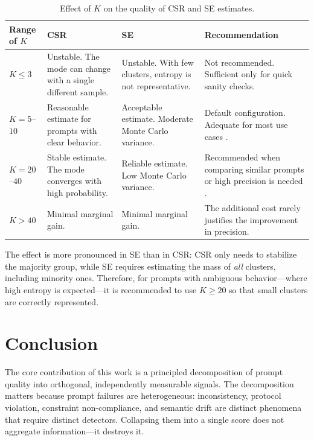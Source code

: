 \documentclass[11pt,a4paper]{article}
\begin{document}
\begin{table}[h]
\centering
\caption{Effect of $K$ on the quality of CSR and SE estimates.}
\label{tab:k}
\begin{tabular}{p{2cm} p{3.5cm} p{3.5cm} p{3.5cm}}
\toprule
Range of $K$ & CSR & SE & Recommendation \\
\midrule
$K \leq 3$ &
Unstable. The mode can change with a single different sample. &
Unstable. With few clusters, entropy is not representative. &
Not recommended. Sufficient only for quick sanity checks. \\
\addlinespace
$K = 5$--$10$ &
Reasonable estimate for prompts with clear behavior. &
Acceptable estimate. Moderate Monte Carlo variance. &
Default configuration. Adequate for most use cases \citep{glape2024}. \\
\addlinespace
$K = 20$--$40$ &
Stable estimate. The mode converges with high probability. &
Reliable estimate. Low Monte Carlo variance. &
Recommended when comparing similar prompts or high precision is needed \citep{selfconsistency2023}. \\
\addlinespace
$K > 40$ &
Minimal marginal gain. &
Minimal marginal gain. &
The additional cost rarely justifies the improvement in precision. \\
\bottomrule
\end{tabular}
\end{table}

\noindent The effect is more pronounced in SE than in CSR: CSR only needs to stabilize the majority group, while SE requires estimating the mass of \textit{all} clusters, including minority ones. Therefore, for prompts with ambiguous behavior—where high entropy is expected—it is recommended to use $K \geq 20$ so that small clusters are correctly represented.

\section{Conclusion}

The core contribution of this work is a principled decomposition of prompt quality into orthogonal, independently measurable signals. The decomposition matters because prompt failures are heterogeneous: inconsistency, protocol violation, constraint non-compliance, and semantic drift are distinct phenomena that require distinct detectors. Collapsing them into a single score does not aggregate information---it destroys it.
\end{document}
